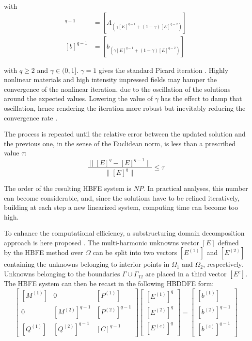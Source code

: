 \documentclass[journal]{IEEEtran}
\begin{document}
\noindent with 
%
\begin{align}
[A]^{q-1} &= [A_{(\gamma [E]^{q-1} + (1-\gamma) [E]^{q-2})}] \\
[b]^{q-1} &= [b_{(\gamma [E]^{q-1} + (1-\gamma) [E]^{q-2})}]
\end{align}

\noindent with $q \geq 2$ and
$\gamma\in(0,1]$. $\gamma=1$ gives the standard Picard iteration \cite{Guarnieri2010}. Highly nonlinear materials and high intensity impressed fields may hamper the convergence of the nonlinear iteration, due to
the oscillation of the solutions around the expected values. Lowering the value
of $\gamma$ has the effect to damp that oscillation, hence rendering the
iteration more robust but inevitably reducing the convergence rate \cite{Silvester1997}.

The process is repeated until the relative error between the updated solution
and the previous one, in the sense of the Euclidean norm, is less than a
prescribed value $\tau$:
%
\begin{equation}
\frac{\|[E]^{q} - [E]^{q-1} \|}{\| [E]^{q} \|} \leq \tau
\end{equation}

The order of the resulting HBFE system is $N P$. In practical analyses, this
number can become considerable, and, since the
solutions have to be refined iteratively, building at each step a new linearized
system, computing time can become too high.

To enhance the computational efficiency, a substructuring domain decomposition
approach is here proposed \cite{Saad2000, Toselli2005, Guarnieri2009,
Guarnieri2010}. The multi-harmonic unknowns vector $[E]$ defined by the HBFE method
over $\Omega$ can be split into two vectors $[E^{(1)}]$ and $[E^{(2)}]$
containing the unknowns belonging to interior points in $\Omega_1$ and
$\Omega_2$, respectively. Unknowns belonging to the boundaries
$\Gamma\cup\Gamma_{12}$ are placed in a third vector $[E^c]$. The HBFE system
can then be recast in the following HBDDFE form:
%
\begin{equation}\label{eq:DD}
\begin{bmatrix}
 [M^{(1)}] &  0  &  [P^{(1)}] \\
 0  &  [M^{(2)}]^{q-1} & [P^{(2)}]^{q-1} \\
 [Q^{(1)}] & [Q^{(2)}]^{q-1} & [C]^{q-1}
\end{bmatrix} 
\begin{bmatrix}
{[E^{(1)}]^{q}} \\
{[E^{(2)}]^{q}} \\
{[E^{(c)}]^{q}}
\end{bmatrix} 
=
\begin{bmatrix}
{[b^{(1)}]} \\
{[b^{(2)}]}^{q-1} \\
{[b^{(c)}]}^{q-1}
\end{bmatrix} 
\end{equation}
\end{document}
